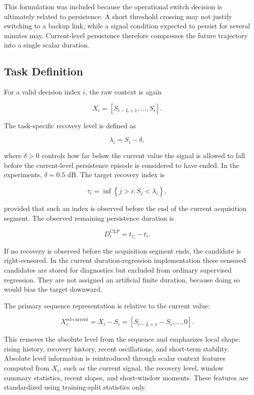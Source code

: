 This formulation was included because the operational switch decision is
ultimately related to persistence. A short threshold crossing may not justify
switching to a backup link, while a signal condition expected to persist for
several minutes may. Current-level persistence therefore compresses the future
trajectory into a single scalar duration.

\subsection{Task Definition}

For a valid decision index \(i\), the raw context is again

\[
  X_i = [S_{i-L+1}, \ldots, S_i].
\]

The task-specific recovery level is defined as

\[
  \lambda_i = S_i - \delta,
\]

where \(\delta>0\) controls how far below the current value the signal is
allowed to fall before the current-level persistence episode is considered to
have ended. In the experiments, \(\delta=0.5\) dB. The target recovery index is

\[
  \tau_i =
  \inf \left\{
    j>i : S_j < \lambda_i
  \right\},
\]

provided that such an index is observed before the end of the current
acquisition segment. The observed remaining persistence duration is

\[
  D_i^{\text{CLP}} = t_{\tau_i} - t_i .
\]

If no recovery is observed before the acquisition segment ends, the candidate is
right-censored. In the current duration-regression implementation these
censored candidates are stored for diagnostics but excluded from ordinary
supervised regression. They are not assigned an artificial finite duration,
because doing so would bias the target downward.

The primary sequence representation is relative to the current value:

\[
  X_i^{\text{rel-current}}
  =
  X_i - S_i
  =
  [S_{i-L+1}-S_i, \ldots, 0].
\]

This removes the absolute level from the sequence and emphasizes local shape:
rising history, recovery history, recent oscillations, and short-term
stability. Absolute level information is reintroduced through scalar context
features computed from \(X_i\), such as the current signal, the recovery level,
window summary statistics, recent slopes, and short-window moments. These
features are standardized using training-split statistics only.

